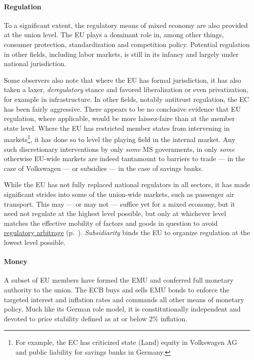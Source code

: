 \paragraph{Regulation} To a significant extent, the regulatory means of mixed economy are also provided at the union level. The \gls{EU} plays a dominant role in, among other things, consumer protection, standardization and competition policy. Potential regulation in other fields, including labor markets, is still in its infancy and largely under national jurisdiction. %

Some observers also note that where the \gls{EU} has formal jurisdiction, it has also taken a laxer, \emph{deregulatory} stance and favored liberalization or even privatization, for example in infrastructure. %
In other fields, notably antitrust regulation, the \gls{EC} has been fairly aggressive. There appears to be no conclusive evidence that \gls{EU} regulation, where applicable, would be more laissez-faire than at the member state level. %
Where the \gls{EU} has restricted member states from intervening in markets\footnote{
	For example, the \gls{EC} has criticized state (Land) equity in Volkswagen AG and public liability for savings banks in Germany.},
it has done so to level the playing field in the internal market. Any such discretionary interventions by only \emph{some} \gls{MS} governments, in only \emph{some} otherwise \gls{EU}-wide markets are indeed tantamount to barriers to trade --- in the case of Volkswagen --- or subsidies --- in the case of savings banks.  %

While the \gls{EU} has not fully replaced national regulators in all sectors, it has made significant strides into some of the union-wide markets, such as passenger air transport. This may --- or may not --- suffice yet for a mixed economy, but it need not regulate at the highest level possible, but only at whichever level matches the effective mobility of factors and goods in question to avoid \hyperref[sec:regulatory]{regulatory arbitrage} (p.~\pageref{sec:regulatory}). \emph{Subsidiarity} binds the \gls{EU} to organize regulation at the lowest level possible.

\paragraph{Money} A subset of \gls{EU} members have formed the \gls{EMU} and conferred full monetary authority to the union. The \gls{ECB} buys and sells \gls{EMU} bonds to enforce the targeted interest and inflation rates and commands all other means of monetary policy. Much like its German role model, it is constitutionally independent and devoted to price stability defined as at or below 2\% inflation.

